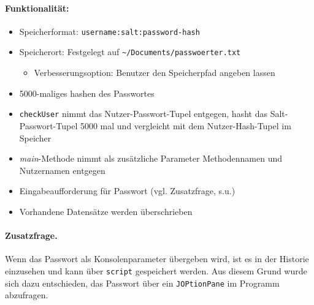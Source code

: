 \documentclass[twoside]{article}
\begin{document}
\paragraph{Funktionalität:}
\begin{itemize}
	\item Speicherformat: \texttt{username:salt:password-hash}
	\item Speicherort: Festgelegt auf \texttt{\textasciitilde/Documents/passwoerter.txt}
	\begin{itemize}
		\item Verbesserungsoption: Benutzer den Speicherpfad angeben lassen
	\end{itemize}
	\item 5000-maliges hashen des Passwortes
	\item \texttt{checkUser} nimmt das Nutzer-Passwort-Tupel entgegen, hasht das Salt-Passwort-Tupel 5000 mal und vergleicht mit dem Nutzer-Hash-Tupel im Speicher
	\item \textit{main}-Methode nimmt als zusätzliche Parameter Methodennamen und Nutzernamen entgegen
	\item Eingabeaufforderung für Passwort (vgl. Zusatzfrage, s.u.)
	\item Vorhandene Datensätze werden überschrieben
\end{itemize}

\paragraph{Zusatzfrage.}
Wenn das Passwort als Konsolenparameter übergeben wird, ist es in der Historie einzusehen und kann über \texttt{script} gespeichert werden.
Aus diesem Grund wurde sich dazu entschieden, das Passwort über ein \texttt{JOPtionPane} im Programm abzufragen.
\end{document}
